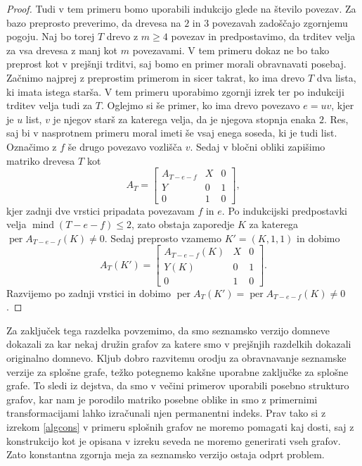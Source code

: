 \documentclass[12pt,a4paper,twoside]{article}
\theoremstyle{definition} %
\theoremstyle{plain} %
\numberwithin{equation}{section}  %
\DeclareMathOperator{\per}{per}
\DeclareMathOperator{\mind}{mind}
\begin{document}
\begin{proof}
Tudi v tem primeru bomo uporabili indukcijo glede na število povezav. Za bazo preprosto preverimo, da drevesa na $2$ in $3$ povezavah zadoščajo zgornjemu pogoju. Naj bo torej $T$ drevo z $m \ge 4$ povezav in predpostavimo, da trditev velja za vsa drevesa z manj kot $m$ povezavami. V tem primeru dokaz ne bo tako preprost kot v prejšnji trditvi, saj bomo en primer morali obravnavati posebaj. Začnimo najprej z preprostim primerom in sicer takrat, ko ima drevo $T$ dva lista, ki imata istega starša. V tem primeru uporabimo zgornji izrek ter po indukciji trditev velja tudi za $T$. Oglejmo si še primer, ko ima drevo povezavo $e=uv$, kjer je $u$ list, $v$ je njegov starš za katerega velja, da je njegova stopnja enaka $2$. Res, saj bi v nasprotnem primeru moral imeti še vsaj enega soseda, ki je tudi list. Označimo z $f$ še drugo povezavo vozlišča $v$. Sedaj v bločni obliki zapišimo matriko drevesa $T$ kot
$$ A_T = \left[ \begin{matrix}
 A_{T-e-f}& X & 0 \\
 Y & 0 & 1 \\
0 & 1 & 0 
\end{matrix} \right] ,$$
kjer zadnji dve vrstici pripadata povezavam $f$ in $e$. Po indukcijski predpostavki velja $\mind(T-e-f) \le 2$, zato obstaja zaporedje $K$ za katerega $\per A_{T-e-f}(K) \neq0$. Sedaj preprosto vzamemo $K' = (K, 1, 1)$ in dobimo
$$ A_T(K') = \left[ \begin{matrix}
 A_{T-e-f}(K)& X & 0 \\
 Y(K) & 0 & 1 \\
0 & 1 & 0 
\end{matrix} \right] .$$
Razvijemo po zadnji vrstici in dobimo $\per A_T(K') = \per  A_{T-e-f}(K) \neq 0$.
 \end{proof}

Za zaključek tega razdelka povzemimo, da smo seznamsko verzijo domneve dokazali za kar nekaj družin grafov za katere smo v prejšnjih razdelkih dokazali originalno domnevo. Kljub dobro razvitemu orodju za obravnavanje seznamske verzije za splošne grafe, težko potegnemo kakšne uporabne zaključke za splošne grafe. To sledi iz dejstva, da smo v večini primerov uporabili posebno strukturo grafov, kar nam je porodilo matriko posebne oblike in smo z primernimi transformacijami lahko izračunali njen permanentni indeks. Prav tako si z izrekom \ref{algcons} v primeru splošnih grafov ne moremo pomagati kaj dosti, saj z konstrukcijo kot je opisana v izreku seveda ne moremo generirati vseh grafov. Zato konstantna zgornja meja za seznamsko verzijo ostaja odprt problem.
\end{document}
